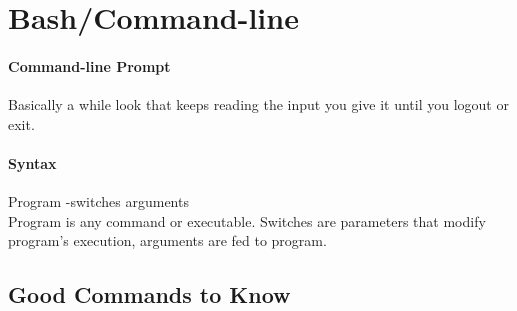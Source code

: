 \documentclass[12 pt]{article}
\begin{document}
	\section{Bash/Command-line} 
	\paragraph{Command-line Prompt}Basically a while look that keeps reading the input you give it until you logout or exit.
	\paragraph{Syntax} Program -switches arguments
	\\ Program is any command or executable. Switches are parameters that modify program's execution, arguments are fed to program. 
	\subsection{Good Commands to Know}
\end{document}
